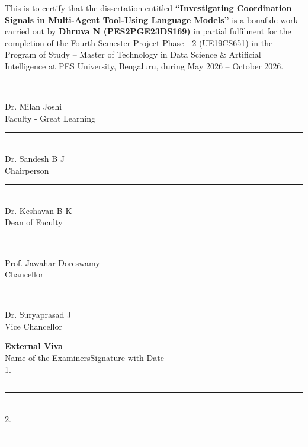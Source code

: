 \documentclass[12pt,a4paper,oneside]{report}
\begin{document}
This is to certify that the dissertation entitled \textbf{``Investigating Coordination Signals in Multi-Agent Tool-Using Language Models''} is a bonafide work carried out by \textbf{Dhruva N (PES2PGE23DS169)} in partial fulfilment for the completion of the Fourth Semester Project Phase - 2 (UE19CS651) in the Program of Study -- Master of Technology in Data Science \& Artificial Intelligence at PES University, Bengaluru, during May 2026 -- October 2026.
\vspace{1.2cm}
\begin{center}
\begin{minipage}[t]{0.30\textwidth}\centering\rule{0.9\linewidth}{0.4pt}\\Dr. Milan Joshi\\Faculty - Great Learning\end{minipage}\hfill
\begin{minipage}[t]{0.30\textwidth}\centering\rule{0.9\linewidth}{0.4pt}\\Dr. Sandesh B J\\Chairperson\end{minipage}\hfill
\begin{minipage}[t]{0.30\textwidth}\centering\rule{0.9\linewidth}{0.4pt}\\Dr. Keshavan B K\\Dean of Faculty\end{minipage}
\end{center}
\vspace{1.4cm}
\begin{center}
\begin{minipage}[t]{0.42\textwidth}\centering\rule{0.9\linewidth}{0.4pt}\\Prof. Jawahar Doreswamy\\Chancellor\end{minipage}\hfill
\begin{minipage}[t]{0.42\textwidth}\centering\rule{0.9\linewidth}{0.4pt}\\Dr. Suryaprasad J\\Vice Chancellor\end{minipage}
\end{center}
\vspace{5cm}
\textbf{External Viva}\\[0.3cm]
Name of the Examiners\hfill Signature with Date\\[0.7cm]
1.\rule{0.4\textwidth}{0.4pt}\hfill\rule{0.4\textwidth}{0.4pt}\\[0.5cm]
2.\rule{0.4\textwidth}{0.4pt}\hfill\rule{0.4\textwidth}{0.4pt}
\clearpage
\ClearShipoutPictureBG
\end{document}
